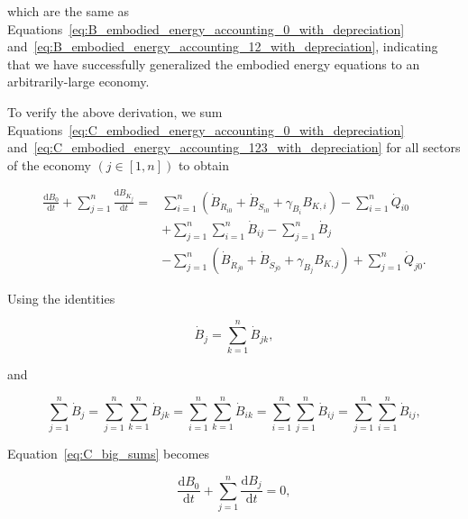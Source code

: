 \noindent which are the same as 
Equations~\ref{eq:B_embodied_energy_accounting_0_with_depreciation}
and~\ref{eq:B_embodied_energy_accounting_12_with_depreciation},
indicating that we have successfully generalized the embodied energy
equations to an arbitrarily-large economy.

To verify the above derivation, 
we sum 
Equations~\ref{eq:C_embodied_energy_accounting_0_with_depreciation} 
and~\ref{eq:C_embodied_energy_accounting_123_with_depreciation} 
for all sectors of the economy $\left( j \in [1,n] \right)$ to obtain

\begin{equation} \label{eq:C_big_sums}
	\begin{split}
		\frac{\mathrm{d}B_{0}}{\mathrm{d}t} 
		+ \sum\limits_{j=1}^n \frac{\mathrm{d}B_{K_{j}}}{\mathrm{d}t} 
		= & 
		 \sum\limits_{i=1}^n 
			\left( \dot{B}_{\dot{R}_{i0}} 
					+ \dot{B}_{\dot{S}_{i0}} 
					+ \gamma_{B_{i}} B_{K,i} \right)
		- \sum\limits_{i=1}^n \dot{Q}_{i0} \\
		& + \sum\limits_{j=1}^n \sum\limits_{i=1}^n \dot{B}_{ij}
		- \sum\limits_{j=1}^n \dot{B}_{j}	\\
		& - \sum\limits_{j=1}^n
				\left( \dot{B}_{\dot{R}_{j0}}
					+ \dot{B}_{\dot{S}_{j0}}
					+ \gamma_{B_{j}} B_{K,j} \right)
		+ \sum\limits_{j=1}^n \dot{Q}_{j0}.
	\end{split}
\end{equation}

\noindent{}Using the identities

\begin{equation} \label{eq:B_identity_1}
	\dot{B}_{j}  
	= \sum\limits_{k=1}^n \dot{B}_{jk},
\end{equation} 

\noindent{}and

\begin{equation} \label{eq:B_identity_2}
	\sum\limits_{j=1}^n\dot{B}_{j}  
	= \sum\limits_{j=1}^n \sum\limits_{k=1}^n \dot{B}_{jk}
	= \sum\limits_{i=1}^n \sum\limits_{k=1}^n \dot{B}_{ik}
	= \sum\limits_{i=1}^n \sum\limits_{j=1}^n \dot{B}_{ij}
	= \sum\limits_{j=1}^n \sum\limits_{i=1}^n \dot{B}_{ij},
\end{equation}

\noindent{}Equation~\ref{eq:C_big_sums} becomes

\begin{equation} \label{eq:C-B_sums_to_zero}
	\frac{\mathrm{d}B_{0}}{\mathrm{d}t} 
	+ \sum\limits_{j=1}^n \frac{\mathrm{d}B_{j}}{\mathrm{d}t} 
	= 0,
\end{equation}

